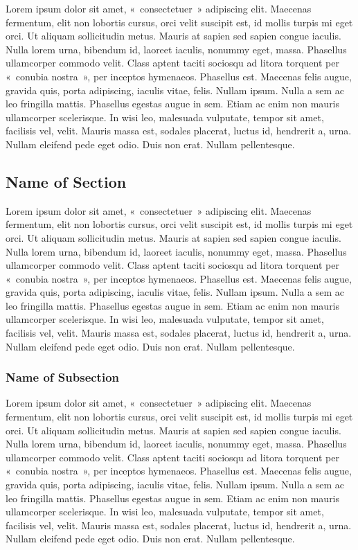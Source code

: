 \documentclass[Master of Arts,synopsis]{iitmdiss}
\begin{document}
\begin{doublespacing}
Lorem ipsum dolor sit amet, «~consectetuer~» adipiscing elit. Maecenas fermentum, elit non lobortis cursus, orci velit suscipit est, id mollis turpis mi eget orci. Ut aliquam sollicitudin metus. Mauris at sapien sed sapien congue iaculis. Nulla lorem urna, bibendum id, laoreet iaculis, nonummy eget, massa. Phasellus ullamcorper commodo velit. Class aptent taciti sociosqu ad litora torquent per «~conubia nostra~», per inceptos hymenaeos. Phasellus est. Maecenas felis augue, gravida quis, porta adipiscing, iaculis vitae, felis. Nullam ipsum. Nulla a sem ac leo fringilla mattis. Phasellus egestas augue in sem. Etiam ac enim non mauris ullamcorper scelerisque. In wisi leo, malesuada vulputate, tempor sit amet, facilisis vel, velit. Mauris massa est, sodales placerat, luctus id, hendrerit a, urna. Nullam eleifend pede eget odio. Duis non erat. Nullam pellentesque.


\subsection{Name of Section}

Lorem ipsum dolor sit amet, «~consectetuer~» adipiscing elit. Maecenas fermentum, elit non lobortis cursus, orci velit suscipit est, id mollis turpis mi eget orci. Ut aliquam sollicitudin metus. Mauris at sapien sed sapien congue iaculis. Nulla lorem urna, bibendum id, laoreet iaculis, nonummy eget, massa. Phasellus ullamcorper commodo velit. Class aptent taciti sociosqu ad litora torquent per «~conubia nostra~», per inceptos hymenaeos. Phasellus est. Maecenas felis augue, gravida quis, porta adipiscing, iaculis vitae, felis. Nullam ipsum. Nulla a sem ac leo fringilla mattis. Phasellus egestas augue in sem. Etiam ac enim non mauris ullamcorper scelerisque. In wisi leo, malesuada vulputate, tempor sit amet, facilisis vel, velit. Mauris massa est, sodales placerat, luctus id, hendrerit a, urna. Nullam eleifend pede eget odio. Duis non erat. Nullam pellentesque.
\subsubsection{Name of Subsection}

Lorem ipsum dolor sit amet, «~consectetuer~» adipiscing elit. Maecenas fermentum, elit non lobortis cursus, orci velit suscipit est, id mollis turpis mi eget orci. Ut aliquam sollicitudin metus. Mauris at sapien sed sapien congue iaculis. Nulla lorem urna, bibendum id, laoreet iaculis, nonummy eget, massa. Phasellus ullamcorper commodo velit. Class aptent taciti sociosqu ad litora torquent per «~conubia nostra~», per inceptos hymenaeos. Phasellus est. Maecenas felis augue, gravida quis, porta adipiscing, iaculis vitae, felis. Nullam ipsum. Nulla a sem ac leo fringilla mattis. Phasellus egestas augue in sem. Etiam ac enim non mauris ullamcorper scelerisque. In wisi leo, malesuada vulputate, tempor sit amet, facilisis vel, velit. Mauris massa est, sodales placerat, luctus id, hendrerit a, urna. Nullam eleifend pede eget odio. Duis non erat. Nullam pellentesque.
\newpage

\end{doublespacing}
\end{document}
